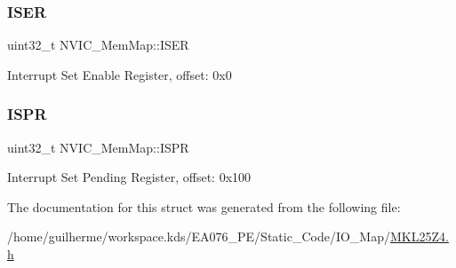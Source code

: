 \subsubsection{\texorpdfstring{I\+S\+ER}{ISER}}
{\footnotesize\ttfamily uint32\+\_\+t N\+V\+I\+C\+\_\+\+Mem\+Map\+::\+I\+S\+ER}

Interrupt Set Enable Register, offset\+: 0x0 \mbox{\label{struct_n_v_i_c___mem_map_a91ab049ba145735fc8d9319f3b0f0cb4}} 
\subsubsection{\texorpdfstring{I\+S\+PR}{ISPR}}
{\footnotesize\ttfamily uint32\+\_\+t N\+V\+I\+C\+\_\+\+Mem\+Map\+::\+I\+S\+PR}

Interrupt Set Pending Register, offset\+: 0x100 

The documentation for this struct was generated from the following file\+:\begin{DoxyCompactItemize}
\item 
/home/guilherme/workspace.\+kds/\+E\+A076\+\_\+\+P\+E/\+Static\+\_\+\+Code/\+I\+O\+\_\+\+Map/\hyperlink{_m_k_l25_z4_8h}{M\+K\+L25\+Z4.\+h}\end{DoxyCompactItemize}
